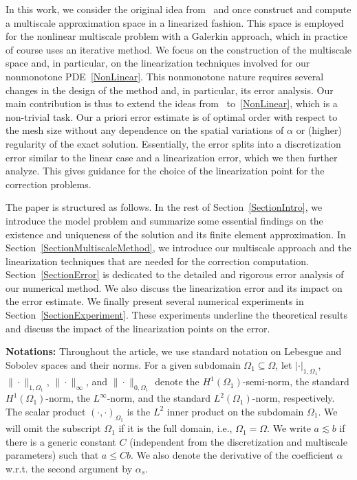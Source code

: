 \documentclass{article}
\newenvironment{notation}
{\par\noindent\textbf{Notations:}\quad}  
  {\par}
\begin{document}
In this work, we consider the original idea from~\cite{Barbara} and once construct and compute a multiscale approximation space in a linearized fashion. This space is employed for the nonlinear multiscale problem with a Galerkin approach, which in practice of course uses an iterative method. We focus on the construction of the multiscale space and, in particular, on the linearization techniques involved for our nonmonotone PDE~\eqref{NonLinear}.
This nonmonotone nature requires several changes in the design of the method and, in particular, its error analysis. Our main contribution is thus to extend the ideas from~\cite{Barbara} to~\eqref{NonLinear}, which is a non-trivial task.
Our a priori error estimate is of optimal order with respect to the mesh size without any dependence on the spatial variations of $\alpha$ or (higher) regularity of the exact solution. Essentially, the error splits into a discretization error similar to the linear case and a linearization error, which we then further analyze. This gives guidance for the choice of the linearization point for the correction problems. 



 
The paper is structured as follows. In the rest of Section~\ref{SectionIntro}, we introduce the model problem and summarize some essential findings on the existence and uniqueness of the solution and its finite element approximation. In Section~\ref{SectionMultiscaleMethod}, we introduce our multiscale approach and the linearization techniques that are needed for the correction computation. Section~\ref{SectionError} is dedicated to the detailed and rigorous error analysis of our numerical method. We also discuss the linearization error and its impact on the error estimate. We finally present several numerical experiments in Section~\ref{SectionExperiment}. These experiments underline the theoretical results and discuss the impact of the linearization points on the error.\\
\begin{notation}
    Throughout the article, we use standard notation on Lebesgue and Sobolev spaces and their norms. For a given subdomain $\Omega_1 \subseteq \Omega$, let $|\cdot|_{1,\Omega_1}$, $\|\cdot \|_{1,\Omega_1}$, $\|\cdot\|_{\infty}$, and $\|\cdot\|_{0,\Omega_1}$ denote the $H^1(\Omega_1)$-semi-norm, the standard $H^1(\Omega_1)$-norm, the $L^\infty$-norm, and the standard $L^2(\Omega_1)$-norm, respectively. The scalar product $(\cdot, \cdot)_{\Omega_1}$ is the $L^2$ inner product on the subdomain $\Omega_1$. We will omit the subscript $\Omega_1$ if it is the full domain, i.e., $\Omega_1=\Omega$. We write $a \lesssim b$ if there is a generic constant $C$ (independent from the discretization and multiscale parameters) such that $a\leq C b$. We also denote the derivative of the coefficient $\alpha$ w.r.t. the second argument by $\alpha_s$. 
 
\end{notation}
\end{document}
